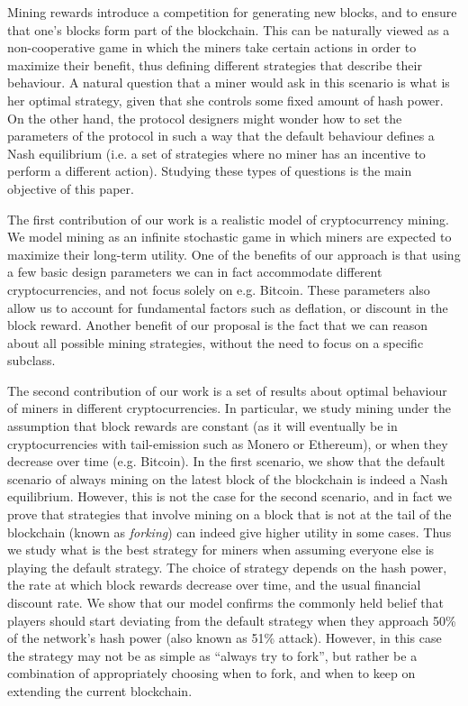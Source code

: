 Mining rewards introduce a competition for generating new blocks, and to ensure that one's blocks form part of the blockchain. This can be naturally viewed as a non-cooperative game in which the miners take certain actions in order to maximize their benefit, thus defining different strategies that describe their behaviour. A natural question
that a miner would ask in this scenario is what is her optimal strategy, given that she controls some fixed amount of hash power. On the other hand, the protocol designers might wonder how to set the parameters of the protocol in such a way that the default behaviour defines a Nash equilibrium (i.e. a set of strategies where no miner has an incentive to perform a different action). Studying these types of questions is the main objective of this paper.

\smallskip
{} The first contribution of our work is a realistic model of cryptocurrency mining. We model mining as an infinite stochastic game in which miners are expected to maximize their long-term utility. One of the benefits of our approach is that using  a few basic design parameters we can in fact accommodate different cryptocurrencies, and not focus solely on e.g. Bitcoin. These parameters also allow us to account for fundamental factors such as deflation, or discount in the block reward. Another benefit of our proposal is the fact that we can reason about all possible mining strategies, without the need to focus on a specific subclass.

The second contribution of our work is a set of results about optimal behaviour of miners in different cryptocurrencies. In particular, we study mining under the assumption that block rewards are constant (as it will eventually be in cryptocurrencies with tail-emission such as Monero or Ethereum), or when they decrease over time (e.g. Bitcoin). In the first scenario, we show that the default scenario of always mining on the latest block of the blockchain is indeed a Nash equilibrium. However, this is not the case for the second scenario, and in fact we 
prove that strategies that involve mining on a block that is not at the tail of the blockchain (known as \emph{forking}) can indeed give higher utility in some cases. Thus we study 
what is the best strategy for miners when assuming everyone else is playing the default strategy. The choice of strategy depends on the hash power, the rate at which 
block rewards decrease over time, and the usual financial discount rate. We show that our model confirms the commonly held belief that players should start deviating from the default strategy 
when they approach 50\% of the network's hash power (also known as 51\% attack). However, in this case the strategy may not be as simple as ``always try to fork'', but rather be a combination 
of appropriately choosing when to fork, and when to keep on extending the current blockchain. 


